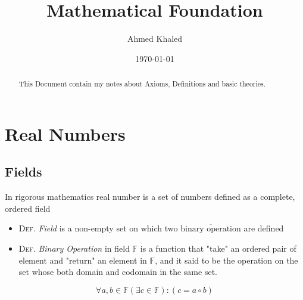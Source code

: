 \documentclass[11pt, a4paper]{article}
\author{Ahmed Khaled}
\date{\today}
\title{Mathematical Foundation}
\begin{document}
\maketitle
\begin{abstract}
This Document contain my notes about Axioms, Definitions and basic theories.
\end{abstract}

\section{Real Numbers}
\label{sec:orgd203bdc}
\subsection{Fields}
\label{sec:org7e4efb2}
In rigorous mathematics real number is a set of numbers defined as a complete, ordered field

\begin{itemize}
\item \textsc{Def}. \emph{Field} is a non-empty set on which two \(\overline{\mbox{binary operation}}\) are
defined 

\item \textsc{Def}. \emph{Binary Operation} in field \(\mathbb{F}\) is a function that "take"
an ordered pair of element and "return" an element in \(\mathbb{F}\), and it said to be
the operation on the set whose both domain and codomain in the same set.
\end{itemize}
\[ \forall a,b \in \mathbb{F} (\exists c \in \mathbb{F}) : (c = a \circ b) \]
\end{document}
